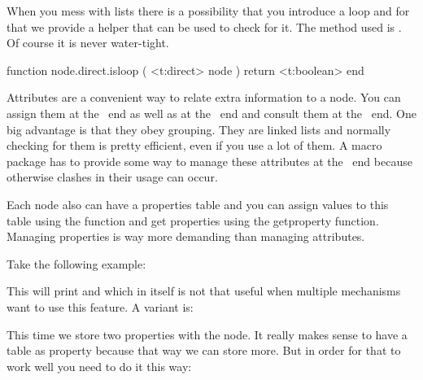 When you mess with lists there is a possibility that you introduce a loop and for
that we provide a helper that can be used to check for it. The method used is
. Of course it is never water-tight.

\starttyping[option=LUA]
function node.direct.isloop (
    <t:direct> node
)
    return <t:boolean>
end
\stoptyping

\stopsubsection

\startsubsection[title={Properties}]

Attributes are a convenient way to relate extra information to a node. You can
assign them at the \TEX\ end as well as at the \LUA\ end and consult them at the
\LUA\ end. One big advantage is that they obey grouping. They are linked lists
and normally checking for them is pretty efficient, even if you use a lot of
them. A macro package has to provide some way to manage these attributes at the
\TEX\ end because otherwise clashes in their usage can occur.

Each node also can have a properties table and you can assign values to this
table using the  function and get properties using the \type
{getproperty} function. Managing properties is way more demanding than managing
attributes.

Take the following example:

\starttyping
{}
\stoptyping

This will print  and  which in itself is not that useful
when multiple mechanisms want to use this feature. A variant is:

\starttyping
{}
\stoptyping

This time we store two properties with the node. It really makes sense to have a
table as property because that way we can store more. But in order for that to
work well you need to do it this way:

\starttyping
{}
\stoptyping

